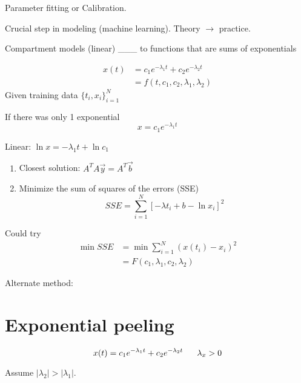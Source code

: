 \documentclass[
	date={November 11{,} 2024},
	month={11},
	day={11}
]{math486notes}
\begin{document}
\tableofcontents

Parameter fitting or Calibration.

Crucial step in modeling (machine learning).
Theory $\rightarrow$ practice.

Compartment models (linear) \_\_\_ to functions that are sums of exponentials

\begin{equation}
	\begin{aligned}
		x(t) &= c_{1}e^{-\lambda_{1}t} + c_{2}e^{-\lambda_{2}t}\\
		&= f(t, c_{1}, c_{2}, \lambda_{1}, \lambda_{2})
	\end{aligned}
	\label{eq:22-1}
\end{equation}
Given training data $\{t_{i}, x_{i}\}_{i=1}^{N}$

If there was only 1 exponential
\begin{equation}
	x = c_{1}e^{-\lambda_{1}t}
	\label{eq:22-2}
\end{equation}

Linear: $\ln x = -\lambda_{1}t + \ln c_{1}$

\begin{enumerate}
	\item Closest solution: $A^{T}A\vec{y} = A^{T}\vec{b}$
	\item Minimize the sum of squares of the errors (SSE)
	\[ SSE = \sum_{i=1}^{N} \left[ -\lambda t_{i} + b - \ln x_{i} \right]^{2} \]
\end{enumerate}

Could try
\begin{equation*}
\begin{aligned}
	\min SSE &= \min \sum_{i=1}^{N} \left( x(t_{i}) - x_{i} \right)^{2}\\
	&= F(c_{1}, \lambda_{1}, c_{2}, \lambda_{2})
\end{aligned}
\end{equation*}

Alternate method:

\section{Exponential peeling}\label{sec:exponential-peeling}
\begin{equation}
	x(t) = c_{1}e^{-\lambda_{1} t} + c_{2}e^{-\lambda_{2} t}\ \ \ \ \ \lambda_{x} > 0\\
	\label{eq:22-4}
\end{equation}

Assume $|\lambda_{2}| > |\lambda_{1}|$.
\end{document}

